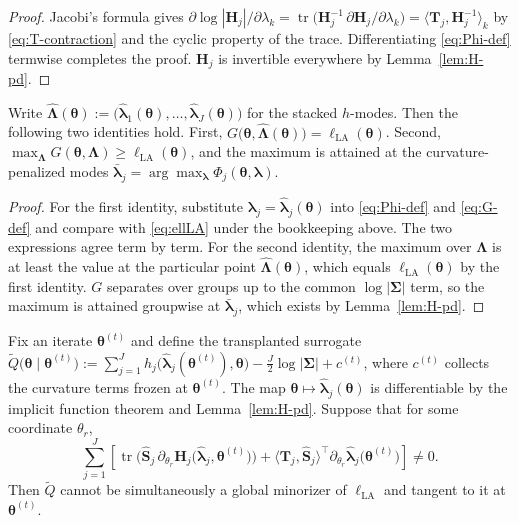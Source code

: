 \begin{proof}
Jacobi's formula gives $\partial\log|\mathbf{H}_{j}|/\partial\lambda_{k}=\operatorname{tr}\big(\mathbf{H}_{j}^{-1}\,\partial\mathbf{H}_{j}/\partial\lambda_{k}\big)=\big\langle\mathbf{T}_{j},\mathbf{H}_{j}^{-1}\big\rangle_{k}$ by \eqref{eq:T-contraction} and the cyclic property of the trace. Differentiating \eqref{eq:Phi-def} termwise completes the proof. $\mathbf{H}_{j}$ is invertible everywhere by Lemma~\ref{lem:H-pd}.
\end{proof}

\begin{lemma}
Write $\hat{\bm{\Lambda}}(\bm{\theta}):=\big(\hat{\bm{\lambda}}_{1}(\bm{\theta}),\dots,\hat{\bm{\lambda}}_{J}(\bm{\theta})\big)$ for the stacked $h$-modes. Then the following two identities hold. First, $G\big(\bm{\theta},\hat{\bm{\Lambda}}(\bm{\theta})\big)=\ell_{\text{LA}}(\bm{\theta})$. Second, $\max_{\bm{\Lambda}}G(\bm{\theta},\bm{\Lambda})\geq\ell_{\text{LA}}(\bm{\theta})$, and the maximum is attained at the curvature-penalized modes $\bar{\bm{\lambda}}_{j}=\arg\max_{\bm{\lambda}}\Phi_{j}(\bm{\theta},\bm{\lambda})$.
\label{lem:G-anchors}
\end{lemma}

\begin{proof}
For the first identity, substitute $\bm{\lambda}_{j}=\hat{\bm{\lambda}}_{j}(\bm{\theta})$ into \eqref{eq:Phi-def} and \eqref{eq:G-def} and compare with \eqref{eq:ellLA} under the bookkeeping above. The two expressions agree term by term. For the second identity, the maximum over $\bm{\Lambda}$ is at least the value at the particular point $\hat{\bm{\Lambda}}(\bm{\theta})$, which equals $\ell_{\text{LA}}(\bm{\theta})$ by the first identity. $G$ separates over groups up to the common $\log|\bm{\Sigma}|$ term, so the maximum is attained groupwise at $\bar{\bm{\lambda}}_{j}$, which exists by Lemma~\ref{lem:H-pd}.
\end{proof}

\begin{proposition}
Fix an iterate $\bm{\theta}^{(t)}$ and define the transplanted surrogate $\tilde{Q}\big(\bm{\theta}\mid\bm{\theta}^{(t)}\big):=\sum_{j=1}^{J}h_{j}\big(\hat{\bm{\lambda}}_{j}(\bm{\theta}^{(t)}),\bm{\theta}\big)-\frac{J}{2}\log|\bm{\Sigma}|+c^{(t)}$, where $c^{(t)}$ collects the curvature terms frozen at $\bm{\theta}^{(t)}$. The map $\bm{\theta}\mapsto\hat{\bm{\lambda}}_{j}(\bm{\theta})$ is differentiable by the implicit function theorem and Lemma~\ref{lem:H-pd}. Suppose that for some coordinate $\theta_{r}$,
\begin{equation}
    \sum_{j=1}^{J}\left[\operatorname{tr}\Big(\hat{\mathbf{S}}_{j}\,\partial_{\theta_{r}}\mathbf{H}_{j}\big(\hat{\bm{\lambda}}_{j},\bm{\theta}^{(t)}\big)\Big)+\big\langle\mathbf{T}_{j},\hat{\mathbf{S}}_{j}\big\rangle^{\top}\partial_{\theta_{r}}\hat{\bm{\lambda}}_{j}\big(\bm{\theta}^{(t)}\big)\right]\neq0.
    \label{eq:obstruction-gap}
\end{equation}
Then $\tilde{Q}$ cannot be simultaneously a global minorizer of $\ell_{\text{LA}}$ and tangent to it at $\bm{\theta}^{(t)}$.
\label{prop:naive-obstruction}
\end{proposition}

